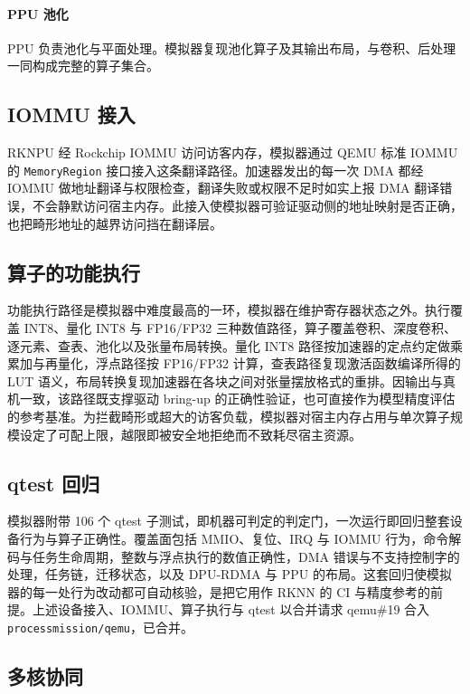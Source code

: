 \paragraph{PPU 池化}
PPU 负责池化与平面处理。模拟器复现池化算子及其输出布局，与卷积、后处理一同构成完整的算子集合。

\subsection{IOMMU 接入}

RKNPU 经 Rockchip IOMMU 访问访客内存，模拟器通过 QEMU 标准 IOMMU 的 \texttt{MemoryRegion} 接口接入这条翻译路径。加速器发出的每一次 DMA 都经 IOMMU 做地址翻译与权限检查，翻译失败或权限不足时如实上报 DMA 翻译错误，不会静默访问宿主内存。此接入使模拟器可验证驱动侧的地址映射是否正确，也把畸形地址的越界访问挡在翻译层。

\subsection{算子的功能执行}

功能执行路径是模拟器中难度最高的一环，模拟器在维护寄存器状态之外。执行覆盖 INT8、量化 INT8 与 FP16/FP32 三种数值路径，算子覆盖卷积、深度卷积、逐元素、查表、池化以及张量布局转换。量化 INT8 路径按加速器的定点约定做乘累加与再量化，浮点路径按 FP16/FP32 计算，查表路径复现激活函数编译所得的 LUT 语义，布局转换复现加速器在各块之间对张量摆放格式的重排。因输出与真机一致，该路径既支撑驱动 bring-up 的正确性验证，也可直接作为模型精度评估的参考基准。为拦截畸形或超大的访客负载，模拟器对宿主内存占用与单次算子规模设定了可配上限，越限即被安全地拒绝而不致耗尽宿主资源。

\subsection{qtest 回归}

模拟器附带 106 个 qtest 子测试，即机器可判定的判定门，一次运行即回归整套设备行为与算子正确性。覆盖面包括 MMIO、复位、IRQ 与 IOMMU 行为，命令解码与任务生命周期，整数与浮点执行的数值正确性，DMA 错误与不支持控制字的处理，任务链，迁移状态，以及 DPU-RDMA 与 PPU 的布局。这套回归使模拟器的每一处行为改动都可自动核验，是把它用作 RKNN 的 CI 与精度参考的前提。上述设备接入、IOMMU、算子执行与 qtest 以合并请求 qemu\#19 合入 \texttt{processmission/qemu}，已合并。

\subsection{多核协同}

